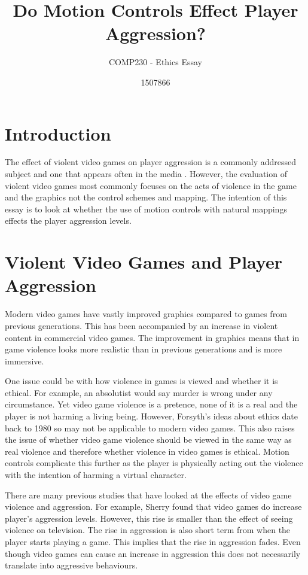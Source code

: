\documentclass{scrartcl}
\title{ Do Motion Controls Effect Player Aggression?}
\subtitle{COMP230 - Ethics Essay}
\author{1507866}
\begin{document}
	
\maketitle
	
	
\section{Introduction}
The effect of violent video games on player aggression is a commonly addressed subject and one that appears often in the media \cite{DailyMail, GuardianAggression, CBSNews}.
However, the evaluation of violent video games most commonly focuses on the acts of violence in the game and the graphics not the control schemes and mapping.  The intention of this essay is to look at whether the use of motion controls with natural mappings effects the player aggression levels.

\section{Violent Video Games and Player Aggression}
 
Modern video games have vastly improved graphics compared to games from previous generations.  \cite{Fumhe}  This has been accompanied by an increase in violent content in commercial video games. \cite{Fumhe} The improvement in graphics means that in game violence looks more realistic than in previous generations and is more immersive. \cite{Kim}

\bigskip
One issue could be with how violence in games is viewed and whether it is ethical. For example, an absolutist would say murder is wrong under any circumstance. \cite{forsyth} 
Yet video game violence is a pretence, none of it is a real and the player is not harming a living being. \cite{Tavinor}
However, Forsyth's ideas about ethics date back to 1980 so may not be applicable to modern video games. 
This also raises the issue of whether video game violence should be viewed in the same way as real violence and therefore whether violence in video games is ethical. Motion controls complicate this further as the player is physically acting out the violence with the intention of harming a virtual character. 

\bigskip
There are many previous studies that have looked at the effects of video game violence and aggression. For example, Sherry found that video games do increase player's aggression levels. However, this rise is smaller than the effect of seeing violence on television.  \cite{sherry2001effects}
The rise in aggression is also short term from when the player starts playing a game. This implies that the rise in aggression fades. Even though video games can cause an increase in aggression this does not necessarily translate into aggressive behaviours.  \cite{Ferguson}  
\end{document}
